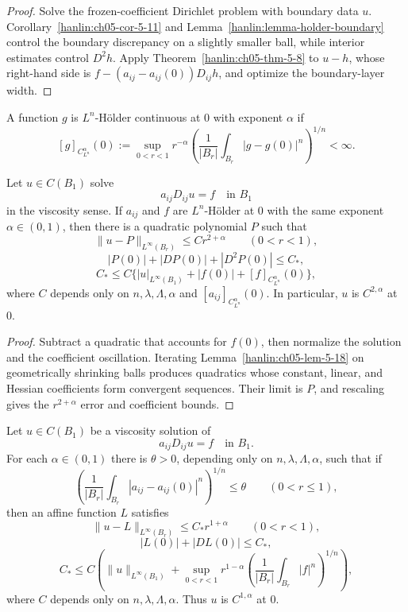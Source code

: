 \begin{proof}
\sketch Solve the frozen-coefficient Dirichlet problem with boundary data
$u$. Corollary~\ref{hanlin:ch05-cor-5-11} and
Lemma~\ref{hanlin:lemma-holder-boundary} control the boundary discrepancy on a
slightly smaller ball, while interior estimates control $D^2h$. Apply
Theorem~\ref{hanlin:ch05-thm-5-8} to $u-h$, whose right-hand side is
$f-(a_{ij}-a_{ij}(0))D_{ij}h$, and optimize the boundary-layer width.
\end{proof}


\begin{definition}\label{hanlin:ch05-def-5-19}
A function $g$ is $L^n$-Hölder continuous at $0$ with exponent $\alpha$ if
\[
[g]_{C^\alpha_{L^n}}(0)
:=\sup_{0<r<1}r^{-\alpha}
\left(\frac1{|B_r|}\int_{B_r}|g-g(0)|^n\right)^{1/n}<\infty.
\]
\end{definition}

\begin{theorem}\label{hanlin:ch05-thm-5-20}
Let $u\in C(B_1)$ solve
\[
a_{ij}D_{ij}u=f\quad\text{in }B_1
\]
in the viscosity sense. If $a_{ij}$ and $f$ are $L^n$-Hölder at $0$ with
the same exponent $\alpha\in(0,1)$, then there is a quadratic polynomial
$P$ such that
\[
\|u-P\|_{L^\infty(B_r)}\leq Cr^{2+\alpha}\qquad(0<r<1),
\]
\[
|P(0)|+|DP(0)|+|D^2P(0)|\le C_*,
\]
\[
C_*\le C\{|u|_{L^\infty(B_1)}+|f(0)|+[f]_{C^\alpha_{L^n}}(0)\},
\]
where $C$ depends only on $n,\lambda,\Lambda,\alpha$ and
$[a_{ij}]_{C^\alpha_{L^n}}(0)$. In particular, $u$ is $C^{2,\alpha}$ at
$0$.
\end{theorem}

\begin{proof}
\sketch Subtract a quadratic that accounts for $f(0)$, then normalize the
solution and the coefficient oscillation. Iterating
Lemma~\ref{hanlin:ch05-lem-5-18} on geometrically shrinking balls produces
quadratics whose constant, linear, and Hessian coefficients form convergent
sequences. Their limit is $P$, and rescaling gives the $r^{2+\alpha}$ error
and coefficient bounds.
\end{proof}


\begin{theorem}\label{hanlin:ch05-thm-5-21}
Let $u\in C(B_1)$ be a viscosity solution of
\[
a_{ij}D_{ij}u=f\quad\text{in }B_1.
\]
For each $\alpha\in(0,1)$ there is $\theta>0$, depending only on
$n,\lambda,\Lambda,\alpha$, such that if
\[
\left(\frac1{|B_r|}\int_{B_r}|a_{ij}-a_{ij}(0)|^n\right)^{1/n}
\leq\theta\qquad(0<r\leq1),
\]
then an affine function $L$ satisfies
\[
\|u-L\|_{L^\infty(B_r)}\leq C_*r^{1+\alpha}\qquad(0<r<1),
\]
\[
|L(0)|+|DL(0)|\leq C_*,
\]
\[
C_*\leq C\left(\|u\|_{L^\infty(B_1)}+
\sup_{0<r<1}r^{1-\alpha}
\left(\frac1{|B_r|}\int_{B_r}|f|^n\right)^{1/n}\right),
\]
where $C$ depends only on $n,\lambda,\Lambda,\alpha$. Thus $u$ is
$C^{1,\alpha}$ at $0$.
\end{theorem}

